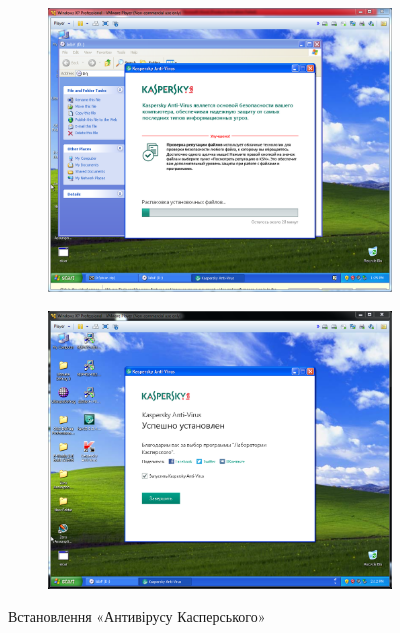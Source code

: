 \documentclass[
	a4paper,
	oneside,
	DIV = 12,
	fontsize = 13pt,
	headings = normal,
]{scrartcl}
\begin{document}
		\begin{figure}[!htbp]
			\centering
			\begin{subfigure}{0.5\textwidth}
				\centering
				\includegraphics[height = 9\baselineskip]{./assets/y03s01-pcdiag-lab-05-p04.PNG}
				\caption{}
				\label{subfig:kaspersky-installation-start}
			\end{subfigure}%
			\begin{subfigure}{0.5\textwidth}
				\centering
				\includegraphics[height = 9\baselineskip]{./assets/y03s01-pcdiag-lab-05-p05.PNG}
				\caption{}
				\label{subfig:kaspersky-installation-finish}
			\end{subfigure}%
			\caption{Встановлення «Антивірусу Касперського»}
			\label{fig:kaspersky-installation}
		\end{figure}
\end{document}

